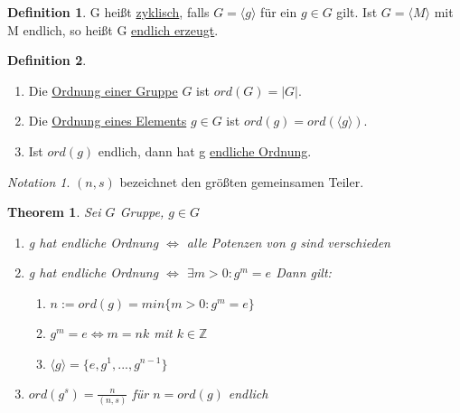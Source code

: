 \documentclass[12pt]{scrartcl}%
\newtheorem{thm}{Theorem}
\theoremstyle{definition}
\newtheorem*{defn}{Definition}
\theoremstyle{remark}
\newtheorem*{notation}{Notation}
\begin{document}
\begin{defn}
	G heißt \underline{zyklisch}, falls $G = \langle g \rangle$ für ein $g \in G$ gilt. \newline
	Ist $G = \langle M \rangle$ mit M endlich, so heißt G \underline{endlich erzeugt}.
\end{defn}

\begin{defn}
	\begin{enumerate}[label=(\roman*)]
		\item Die \underline{Ordnung einer Gruppe} $G$ ist $ord(G)=\vert G \vert$.
		\item Die \underline{Ordnung eines Elements} $g \in G$ ist $ord(g)=ord(\langle g \rangle)$.
		\item Ist $ord(g)$ endlich, dann hat g \underline{endliche Ordnung}.
	\end{enumerate}
\end{defn}

\begin{notation}
    $(n,s)$ bezeichnet den größten gemeinsamen Teiler.
\end{notation}

\begin{thm}
	Sei $G$ Gruppe, $g \in G$
	\begin{enumerate}
		\item g hat endliche Ordnung $\Longleftrightarrow$ alle Potenzen von g sind verschieden
		\item g hat endliche Ordnung $\Longleftrightarrow$ $\exists m>0: g^{m}=e$ \newline Dann gilt:
			\begin{enumerate}[label=(\alph*)]
				\item $n := ord(g) = min \lbrace m>0 : g^{m}=e \rbrace$
				\item $g^{m}=e \Longleftrightarrow m=nk$ mit $k \in \mathbb{Z}$
				\item $\langle g \rangle = \lbrace e, g^{1},...,g^{n-1}\rbrace$
			\end{enumerate}
		\item $ord(g^{s}) = \frac{n}{(n,s)}$ für $n = ord(g)$ endlich
	\end{enumerate}
\end{thm}
\end{document}
